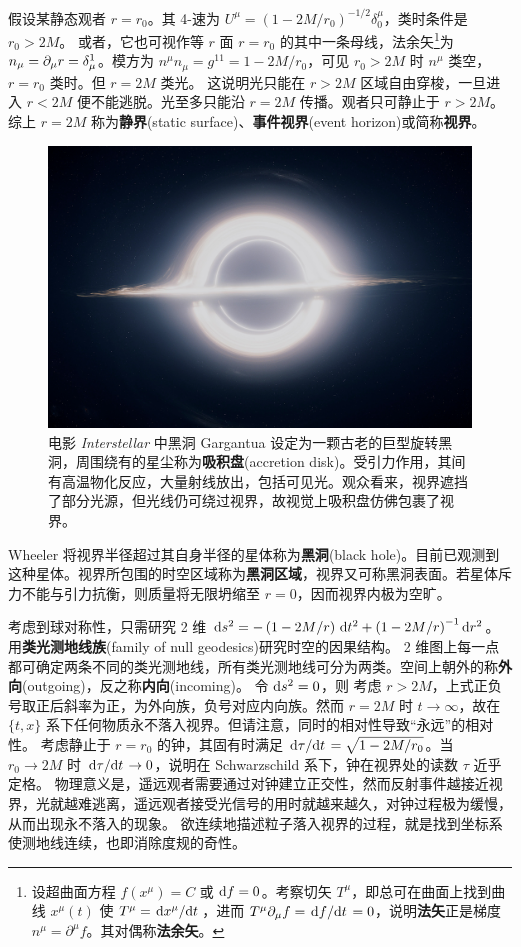 假设某静态观者 $r=r_0$。其 4-速为 $U^\mu=(1-2M/r_0)^{-1/2}\delta^\mu_0$，类时条件是 $r_0>2 M$。
或者，它也可视作等 $r$ 面 $r=r_0$ 的其中一条母线，法余矢\footnote{设超曲面方程 $f(x^\mu)=C$ 或 $\dd f=0$。考察切矢 $T^\mu$，即总可在曲面上找到曲线 $x^\mu(t)$ 使 $T^\mu=\dv*{x^\mu}{t}$，进而 $T^\mu\partial_\mu f=\dv*{f}{t}=0$，说明\textbf{法矢}正是梯度 $n^\mu=\partial^\mu f$。其对偶称\textbf{法余矢}。}为 $n_\mu=\partial_\mu r=\delta^1_\mu$。模方为 $n^\mu n_\mu=g^{11}=1-2M/r_0$，可见 $r_0>2M$ 时 $n^\mu$ 类空，$r=r_0$ 类时。但 $r=2M$ 类光。
这说明光只能在 $r>2M$ 区域自由穿梭，一旦进入 $r<2M$ 便不能逃脱。光至多只能沿 $r=2M$ 传播。观者只可静止于 $r>2M$。
综上 $r=2M$ 称为\textbf{静界}(static surface)、\textbf{事件视界}(event horizon)或简称\textbf{视界}。
\begin{figure}[h!]
    \centering
    \includegraphics[width=.7\textwidth]{fig/chpt01/blackhole.jpg}
    \caption{\small 电影 \textit{Interstellar} 中黑洞 Gargantua 设定为一颗古老的巨型旋转黑洞，周围绕有的星尘称为\textbf{吸积盘}(accretion disk)。受引力作用，其间有高温物化反应，大量射线放出，包括可见光。观众看来，视界遮挡了部分光源，但光线仍可绕过视界，故视觉上吸积盘仿佛包裹了视界。}
\end{figure}
Wheeler 将视界半径超过其自身半径的星体称为\textbf{黑洞}(black hole)。目前已观测到这种星体。视界所包围的时空区域称为\textbf{黑洞区域}，视界又可称黑洞表面。若星体斥力不能与引力抗衡，则质量将无限坍缩至 $r=0$，因而视界内极为空旷。

考虑到球对称性，只需研究 2 维 $\dd s^2=-\left(1-{2M}/{r}\right)\,\text d t^2+\left(1-{2M}/{r}\right)^{-1}\text d r^2$。
用\textbf{类光测地线族}(family of null geodesics)研究时空的因果结构。
2 维图上每一点都可确定两条不同的类光测地线，所有类光测地线可分为两类。空间上朝外的称\textbf{外向}(outgoing)，反之称\textbf{内向}(incoming)。
令 $\dd s^2=0$，则
考虑 $r>2M$，上式正负号取正后斜率为正，为外向族，负号对应内向族。然而 $r=2M$ 时 $t\to\infty$，故在 $\{t,x\}$ 系下任何物质永不落入视界。但请注意，同时的相对性导致“永远”的相对性。
考虑静止于 $r=r_0$ 的钟，其固有时满足 $\dv*{\tau}{t}={\sqrt{1-2M/r_0}}$。当 $r_0\to 2M$ 时 $\dv*{\tau}{t}\to 0$，说明在 Schwarzschild 系下，钟在视界处的读数 $\tau$ 近乎定格。
物理意义是，遥远观者需要通过对钟建立正交性，然而反射事件越接近视界，光就越难逃离，遥远观者接受光信号的用时就越来越久，对钟过程极为缓慢，从而出现永不落入的现象。
欲连续地描述粒子落入视界的过程，就是找到坐标系使测地线连续，也即消除度规的奇性。

